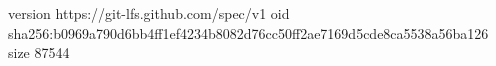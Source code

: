 version https://git-lfs.github.com/spec/v1
oid sha256:b0969a790d6bb4ff1ef4234b8082d76cc50ff2ae7169d5cde8ca5538a56ba126
size 87544
